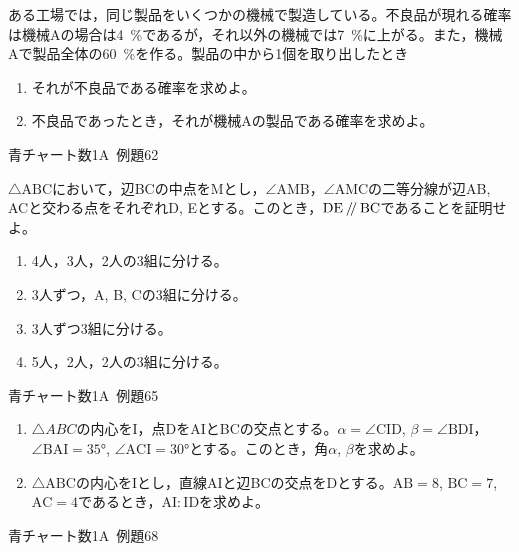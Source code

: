 \documentclass[b4paper, dvipdfmx, 11pt, fleqn, twocolumn, uplatex]{jsarticle}
\makeatletter
\newcommand{\varParallel}{\def\@varParallel{\kern .2em/\kern-.2em /\kern .2em}%
  \mathchoice%
  {\@varParallel}%
  {\textstyle\@varParallel}%
  {\scriptscriptstyle\@varParallel}%
  {\scriptscriptstyle\@varParallel}}
\makeatother
\begin{document}

\begin{screen}
ある工場では，同じ製品をいくつかの機械で製造している。不良品が現れる確率は機械Aの場合は\SI{4}{\%}であるが，それ以外の機械では\SI{7}{\%}に上がる。また，機械Aで製品全体の\SI{60}{\%}を作る。製品の中から1個を取り出したとき
\begin{enumerate}[label={(\arabic*)}]
\item それが不良品である確率を求めよ。
\item 不良品であったとき，それが機械Aの製品である確率を求めよ。
\end{enumerate}
\begin{flushright}
    青チャート数1A~例題62
\end{flushright}
\end{screen}



\begin{screen}
$\triangle{\mathrm{ABC}}$において，辺BCの中点をMとし，$\angle{\mathrm{AMB}}$，$\angle{\mathrm{AMC}}$の二等分線が辺AB, ACと交わる点をそれぞれD, Eとする。このとき，$\mathrm{DE}\varParallel\mathrm{BC}$であることを証明せよ。
\begin{enumerate}[label={(\arabic*)}]
\item 4人，3人，2人の3組に分ける。
\item 3人ずつ，A, B, Cの3組に分ける。
\item 3人ずつ3組に分ける。
\item 5人，2人，2人の3組に分ける。
\end{enumerate}
\begin{flushright}
    青チャート数1A~例題65
\end{flushright}
\end{screen}


\begin{screen}
\begin{enumerate}[label={(\arabic*)}]
\item $\triangle{ABC}$の内心をI，点DをAIとBCの交点とする。$\alpha=\angle\mathrm{CID}$, $\beta=\angle\mathrm{BDI}$，$\angle\mathrm{BAI}=\ang{35}$, $\angle\mathrm{ACI}=\ang{30}$とする。このとき，角$\alpha$, $\beta$を求めよ。
\item $\triangle{\mathrm{ABC}}$の内心をIとし，直線AIと辺BCの交点をDとする。$\mathrm{AB}=8$, $\mathrm{BC}=7$, $\mathrm{AC}=4$であるとき，$\mathrm{AI}:\mathrm{ID}$を求めよ。
\end{enumerate}
\begin{flushright}
    青チャート数1A~例題68
\end{flushright}
\end{screen}
\end{document}
